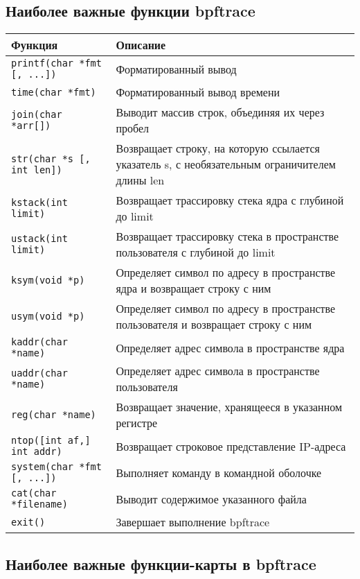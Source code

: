 \subsection{Наиболее важные функции bpftrace}
\begin{tabular}{|l|p{9cm}|}
\hline
\rowcolor{gray!40}
Функция & Описание \\
\hline
\texttt{printf(char *fmt [, ...])} & Форматированный вывод \\
\hline
\texttt{time(char *fmt)} & Форматированный вывод времени \\
\hline
\texttt{join(char *arr[])} & Выводит массив строк, объединяя их через пробел \\
\hline
\texttt{str(char *s [, int len])} & Возвращает строку, на которую ссылается указатель s, с необязательным ограничителем длины len  \\
\hline
\texttt{kstack(int limit) } & Возвращает трассировку стека ядра с глубиной до limit  \\
\hline
\texttt{ustack(int limit) } & Возвращает трассировку стека в пространстве пользователя с глубиной до limit \\
\hline
\texttt{ksym(void *p) } & Определяет символ по адресу в пространстве ядра и возвращает строку с ним  \\
\hline
\texttt{usym(void *p) } & Определяет символ по адресу в пространстве пользователя и возвращает строку с ним  \\
\hline
\texttt{kaddr(char *name) } & Определяет адрес символа в пространстве ядра  \\
\hline
\texttt{uaddr(char *name) } & Определяет адрес символа в пространстве пользователя  \\
\hline
\texttt{reg(char *name) } & Возвращает значение, хранящееся в указанном регистре  \\
\hline
\texttt{ntop([int af,] int addr) } & Возвращает строковое представление IP-адреса  \\
\hline
\texttt{system(char *fmt [, ...]) } & Выполняет команду в командной оболочке  \\
\hline
\texttt{cat(char *filename) } & Выводит содержимое указанного файла  \\
\hline
\texttt{exit() } & Завершает выполнение bpftrace  \\
\hline
\end{tabular}

\subsection{Наиболее важные функции-карты в bpftrace}

